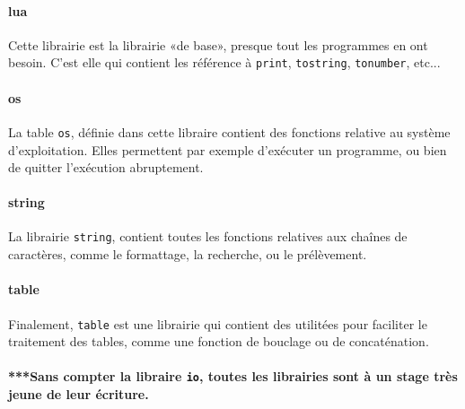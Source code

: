 \documentclass{article}
\begin{document}
\paragraph{lua}
Cette librairie est la librairie «de base», presque tout les programmes en ont besoin. C'est elle qui contient les référence à \texttt{print}, \texttt{tostring}, \texttt{tonumber}, etc...

\paragraph{os}
La table \texttt{os}, définie dans cette libraire contient des fonctions relative au système d'exploitation. Elles permettent par exemple d'exécuter un programme, ou bien de quitter l'exécution abruptement.

\paragraph{string}
La librairie \texttt{string}, contient toutes les fonctions relatives aux chaînes de caractères, comme le formattage, la recherche, ou le prélèvement.

\paragraph{table}
Finalement, \texttt{table} est une librairie qui contient des utilitées pour faciliter le traitement des tables, comme une fonction de bouclage ou de concaténation.

\paragraph{}
\textbf{\color{red}***Sans compter la libraire \texttt{io}, toutes les librairies sont à un stage très jeune de leur écriture.}

\newpage
\end{document}
